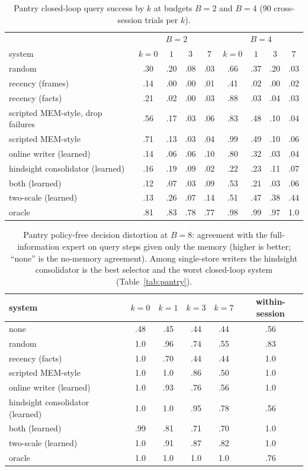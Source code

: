 \documentclass{article}
\begin{document}
\begin{table}[h]
\centering\small
\caption{Pantry closed-loop query success by $k$ at budgets $B{=}2$ and $B{=}4$ (90 cross-session trials per $k$).}
\setlength{\tabcolsep}{4pt}
\begin{tabular}{lcccccccc}
\toprule
& \multicolumn{4}{c}{$B{=}2$} & \multicolumn{4}{c}{$B{=}4$}\\
system & $k{=}0$ & $1$ & $3$ & $7$ & $k{=}0$ & $1$ & $3$ & $7$\\
\midrule
random & .30 & .20 & .08 & .03 & .66 & .37 & .20 & .03\\
recency (frames) & .14 & .00 & .00 & .01 & .41 & .02 & .00 & .02\\
recency (facts) & .21 & .02 & .00 & .03 & .88 & .03 & .04 & .03\\
scripted MEM-style, drop failures & .56 & .17 & .03 & .06 & .83 & .48 & .10 & .04\\
scripted MEM-style & .71 & .13 & .03 & .04 & .99 & .49 & .10 & .06\\
online writer (learned) & .14 & .06 & .06 & .10 & .80 & .32 & .03 & .04\\
hindsight consolidator (learned) & .16 & .19 & .09 & .02 & .22 & .23 & .11 & .07\\
both (learned) & .12 & .07 & .03 & .09 & .53 & .21 & .03 & .06\\
two-scale (learned) & .13 & .26 & .07 & .14 & .51 & .47 & .38 & .44\\
oracle & .81 & .83 & .78 & .77 & .98 & .99 & .97 & 1.0\\
\bottomrule
\end{tabular}
\end{table}

\begin{table}[h]
\centering\small
\caption{Pantry policy-free decision distortion at $B{=}8$: agreement with the full-information expert on query steps given only the memory (higher is better; ``none'' is the no-memory agreement). Among single-store writers the hindsight consolidator is the best selector and the worst closed-loop system (Table~\ref{tab:pantry}).}
\setlength{\tabcolsep}{5pt}
\begin{tabular}{lccccc}
\toprule
system & $k{=}0$ & $k{=}1$ & $k{=}3$ & $k{=}7$ & within-session\\
\midrule
none & .48 & .45 & .44 & .44 & .56\\
random & 1.0 & .96 & .74 & .55 & .83\\
recency (facts) & 1.0 & .70 & .44 & .44 & 1.0\\
scripted MEM-style & 1.0 & 1.0 & .86 & .50 & 1.0\\
online writer (learned) & 1.0 & .93 & .76 & .56 & 1.0\\
hindsight consolidator (learned) & 1.0 & 1.0 & .95 & .78 & .56\\
both (learned) & .99 & .81 & .71 & .70 & 1.0\\
two-scale (learned) & 1.0 & .91 & .87 & .82 & 1.0\\
oracle & 1.0 & 1.0 & 1.0 & 1.0 & .76\\
\bottomrule
\end{tabular}
\end{table}
\end{document}
